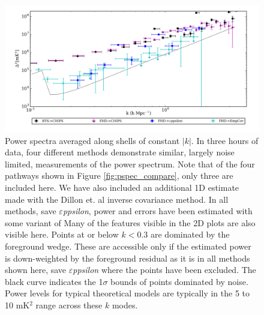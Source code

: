 \documentclass[preprint2]{aastex}
\def\eppsilon{{\it $\varepsilon$ppsilon}}
\begin{document}
\begin{figure}[h!]

\includegraphics[width=\textwidth]{figures/MWA_PS_Compare/MWAPipeline_compare_1d_radial_logbryna.png}
\caption{Power spectra averaged along shells of constant $|k|$. In three hours of data, four different methods demonstrate similar, largely noise limited, measurements of the power spectrum. Note that of the four pathways shown in Figure \ref{fig:pspec_compare}, only three are included here. We have also included an additional 1D estimate made with the Dillon et. al inverse covariance method. In all methods, save \eppsilon{}, power and errors have been estimated with some variant of Many of the features visible in the 2D plots are also visible here. Points at or below $k<0.3$ are dominated by the foreground wedge. These are accessible only if the estimated power is down-weighted by the foreground residual as it is in all methods shown here, save \eppsilon{} where the points have been excluded. The black curve indicates the 1$\sigma$ bounds of points dominated by noise.  Power levels for typical theoretical models are typically in the 5 to 10 mK$^2$ range across these $k$ modes.
\label{fig:1D_pspecs}}
\end{figure}
\end{document}
